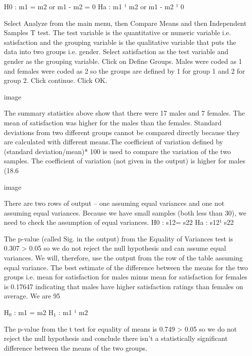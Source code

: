 H0 : m1 = m2 or m1 - m2 = 0
Ha : m1 ¹ m2 or m1 - m2 ¹ 0
 
 
Select Analyze from the main menu, then Compare Means and then Independent Samples T test. The test variable is the quantitative or numeric variable i.e. satisfaction and the grouping variable is the qualitative variable that puts the data into two groups i.e. gender. Select satisfaction as the test variable and gender as the grouping variable. Click on Define Groups. Males were coded as 1 and females were coded as 2 so the groups are defined by 1 for group 1 and 2 for group 2. Click continue. Click OK.
 
image
 
The summary statistics above show that there were 17 males and 7 females. The mean of satisfaction was higher for the males than the females.  Standard deviations from two different groups cannot be compared directly because they are calculated with different means.The coefficient of variation defined by (standard deviation/mean)* 100 is used to compare the variation of the two samples. The coefficient of variation (not given in the output) is higher for males (18.6%
 
image
 
 
 
There are two rows of output – one assuming equal variances and one not assuming equal variances. Because we have small samples (both less than 30), we need to check the assumption of equal variances.
H0 : s12= s22
Ha : s12¹  s22
 
The p-value (called Sig. in the output) from the Equality of Variances test is 0.307 > 0.05 so we do not reject the null hypothesis and can assume equal variances. We will, therefore, use the output from the row of the table assuming equal variance. The best estimate of the difference between the means for the two groups i.e. mean for satisfaction for males minus mean for satisfaction for females is 0.17647 indicating that males have higher satisfaction ratings than females on average. We are 95%

\begin{description} 
H$_0$ : m1 = m2
H$_1$ : m1 ¹ m2
\end{description} 
The p-value from the t test for equality of means is 0.749 > 0.05 so we do not reject the null hypothesis and conclude there isn’t a statistically significant difference between the means of the two groups.
 

